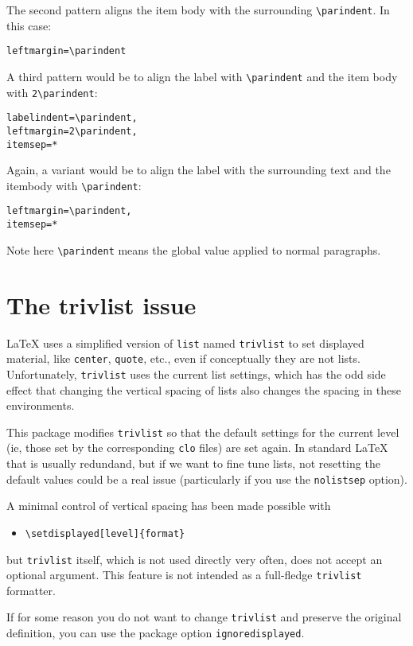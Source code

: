 \documentclass{article}
\begin{document}
The second pattern aligns the item body with the surrounding
\verb|\parindent|. In this case:
\begin{verbatim}
leftmargin=\parindent
\end{verbatim}

A third pattern would be to align the label with \verb|\parindent|
and the item body with \verb|2\parindent|:
\begin{verbatim}
labelindent=\parindent,
leftmargin=2\parindent,
itemsep=*
\end{verbatim}
Again, a variant would be to align the label with the surrounding
text and the itembody with \verb|\parindent|:
\begin{verbatim}
leftmargin=\parindent,
itemsep=*
\end{verbatim}

Note here \verb|\parindent| means the global value applied
to normal paragraphs.

\section{The trivlist issue}

\LaTeX{} uses a simplified version of \verb|list| named 
\verb|trivlist| to set displayed material, like \verb|center|, 
\verb|quote|, etc., even if conceptually they are not lists. 
Unfortunately, \verb|trivlist| uses the current list settings, which 
has the odd side effect that changing the vertical spacing of lists 
also changes the spacing in these environments.

This package modifies \verb|trivlist| so that the default settings for 
the current level (ie, those set by the corresponding \verb|clo| 
files) are set again. In standard \LaTeX{} that is usually redundand, 
but if we want to fine tune lists, not resetting the default values 
could be a real issue (particularly if you use the \verb|nolistsep| 
option).

A minimal control of vertical spacing has been made possible with
\begin{itemize}
\item \verb|\setdisplayed[level]{format}|
\end{itemize}
but \verb|trivlist| itself, which is not used directly very
often, does not accept an optional argument. This feature
is not intended as a full-fledge \verb|trivlist| formatter.

If for some reason you do not want to change \verb|trivlist|
and preserve the original definition, you can use the
package option \verb|ignoredisplayed|.
\end{document}
